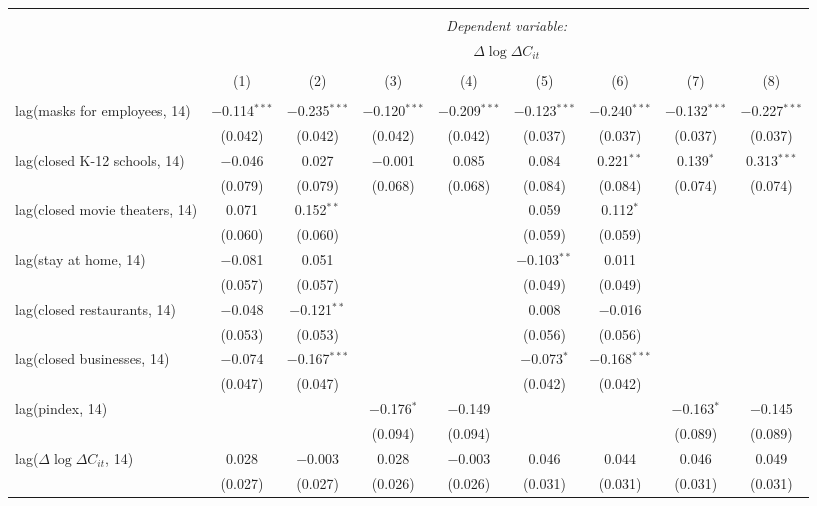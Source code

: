 \begin{tabular}{@{\extracolsep{1pt}}lcccccccc} 
\\[-1.8ex]\hline 
\hline \\[-1.8ex] 
 & \multicolumn{8}{c}{\textit{Dependent variable:}} \\ 
\cline{2-9} 
 & \multicolumn{8}{c}{$\Delta \log \Delta C_{it}$} \\ 
\\[-1.8ex] & (1) & (2) & (3) & (4) & (5) & (6) & (7) & (8)\\ 
\hline \\[-1.8ex] 
 lag(masks for employees, 14) & $-$0.114$^{***}$ & $-$0.235$^{***}$ & $-$0.120$^{***}$ & $-$0.209$^{***}$ & $-$0.123$^{***}$ & $-$0.240$^{***}$ & $-$0.132$^{***}$ & $-$0.227$^{***}$ \\ 
  & (0.042) & (0.042) & (0.042) & (0.042) & (0.037) & (0.037) & (0.037) & (0.037) \\ 
  lag(closed K-12 schools, 14) & $-$0.046 & 0.027 & $-$0.001 & 0.085 & 0.084 & 0.221$^{**}$ & 0.139$^{*}$ & 0.313$^{***}$ \\ 
  & (0.079) & (0.079) & (0.068) & (0.068) & (0.084) & (0.084) & (0.074) & (0.074) \\ 
  lag(closed movie theaters, 14) & 0.071 & 0.152$^{**}$ &  &  & 0.059 & 0.112$^{*}$ &  &  \\ 
  & (0.060) & (0.060) &  &  & (0.059) & (0.059) &  &  \\ 
  lag(stay at home, 14) & $-$0.081 & 0.051 &  &  & $-$0.103$^{**}$ & 0.011 &  &  \\ 
  & (0.057) & (0.057) &  &  & (0.049) & (0.049) &  &  \\ 
  lag(closed restaurants, 14) & $-$0.048 & $-$0.121$^{**}$ &  &  & 0.008 & $-$0.016 &  &  \\ 
  & (0.053) & (0.053) &  &  & (0.056) & (0.056) &  &  \\ 
  lag(closed businesses, 14) & $-$0.074 & $-$0.167$^{***}$ &  &  & $-$0.073$^{*}$ & $-$0.168$^{***}$ &  &  \\ 
  & (0.047) & (0.047) &  &  & (0.042) & (0.042) &  &  \\ 
  lag(pindex, 14) &  &  & $-$0.176$^{*}$ & $-$0.149 &  &  & $-$0.163$^{*}$ & $-$0.145 \\ 
  &  &  & (0.094) & (0.094) &  &  & (0.089) & (0.089) \\ 
  lag($\Delta \log \Delta C_{it}$, 14) & 0.028 & $-$0.003 & 0.028 & $-$0.003 & 0.046 & 0.044 & 0.046 & 0.049 \\ 
  & (0.027) & (0.027) & (0.026) & (0.026) & (0.031) & (0.031) & (0.031) & (0.031) \\ 

\end{tabular}
